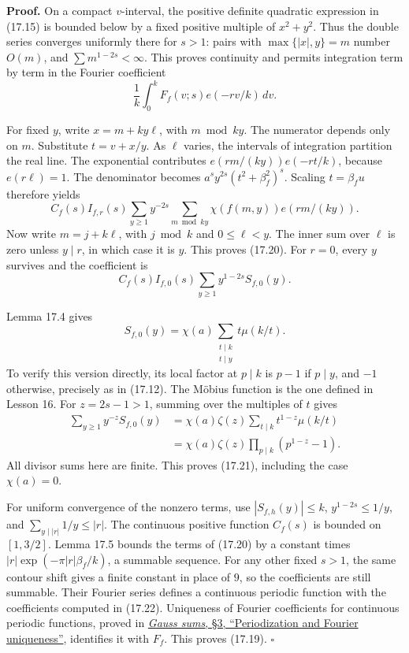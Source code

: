 \documentclass[
  11pt,
  a4paper,
]{article}
\begin{document}
\textbf{Proof.} On a compact \(v\)-interval, the positive definite
quadratic expression in (17.15) is bounded below by a fixed positive
multiple of \(x^2+y^2\). Thus the double series converges uniformly
there for \(s>1\): pairs with \(\max\{|x|,y\}=m\) number \(O(m)\), and
\(\sum m^{1-2s}<\infty\). This proves continuity and permits integration
term by term in the Fourier coefficient \[
 \frac1k\int_0^kF_f(v;s)e(-rv/k)\,dv.
 \tag{17.22}
\]

For fixed \(y\), write \(x=m+ky\ell\), with \(m\bmod ky\). The numerator
depends only on \(m\). Substitute \(t=v+x/y\). As \(\ell\) varies, the
intervals of integration partition the real line. The exponential
contributes \(e(rm/(ky))e(-rt/k)\), because \(e(r\ell)=1\). The
denominator becomes \(a^sy^{2s}(t^2+\beta_f^2)^s\). Scaling
\(t=\beta_fu\) therefore yields \[
 C_f(s)I_{f,r}(s)\sum_{y\ge1}y^{-2s}
       \sum_{m\bmod ky}\chi(f(m,y))e(rm/(ky)).
 \tag{17.23}
\] Now write \(m=j+k\ell\), with \(j\bmod k\) and \(0\le\ell<y\). The
inner sum over \(\ell\) is zero unless \(y\mid r\), in which case it is
\(y\). This proves (17.20). For \(r=0\), every \(y\) survives and the
coefficient is \[
 C_f(s)I_{f,0}(s)\sum_{y\ge1}y^{1-2s}S_{f,0}(y).
 \tag{17.24}
\]

Lemma 17.4 gives \[
 S_{f,0}(y)=\chi(a)\sum_{\substack{t\mid k\\t\mid y}}
                            t\mu(k/t).
 \tag{17.25}
\] To verify this version directly, its local factor at \(p\mid k\) is
\(p-1\) if \(p\mid y\), and \(-1\) otherwise, precisely as in (17.12).
The Möbius function is the one defined in Lesson 16. For \(z=2s-1>1\),
summing over the multiples of \(t\) gives \[
 \begin{aligned}
 \sum_{y\ge1}y^{-z}S_{f,0}(y)
 &=\chi(a)\zeta(z)\sum_{t\mid k}t^{1-z}\mu(k/t)\\
 &=\chi(a)\zeta(z)\prod_{p\mid k}(p^{1-z}-1).
 \end{aligned}
 \tag{17.26}
\] All divisor sums here are finite. This proves (17.21), including the
case \(\chi(a)=0\).

For uniform convergence of the nonzero terms, use \(|S_{f,h}(y)|\le k\),
\(y^{1-2s}\le1/y\), and \(\sum_{y\mid|r|}1/y\le |r|\). The continuous
positive function \(C_f(s)\) is bounded on \([1,3/2]\). Lemma 17.5
bounds the terms of (17.20) by a constant times
\(|r|\exp(-\pi|r|\beta_f/k)\), a summable sequence. For any other fixed
\(s>1\), the same contour shift gives a finite constant in place of
\(9\), so the coefficients are still summable. Their Fourier series
defines a continuous periodic function with the coefficients computed in
(17.22). Uniqueness of Fourier coefficients for continuous periodic
functions, proved in
\href{https://kokunoyumeto.github.io/open-math-courses-public/courses/NT-DIRL/NT-DIRL-03.html\#periodization-and-fourier-uniqueness}{\emph{Gauss
sums}, §3, ``Periodization and Fourier uniqueness''}, identifies it with
\(F_f\). This proves (17.19). \(\square\)
\end{document}
